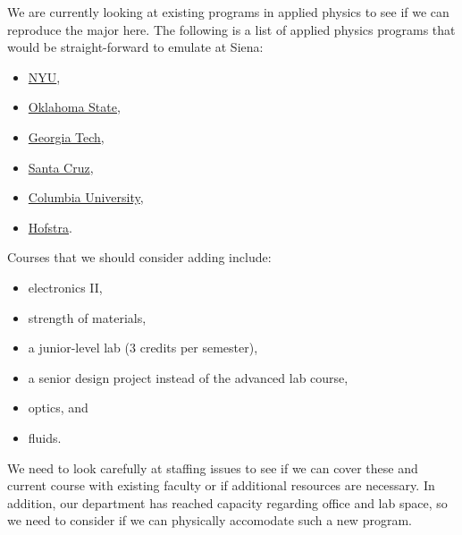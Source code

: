 \documentclass[12pt]{article}
\begin{document}
We are currently looking at existing programs in applied physics to see if we can reproduce the 
major here.  The following is a list of applied physics programs that would be straight-forward to emulate at Siena:
\vspace*{-.4cm}
\begin{itemize}
\item \href{http://engineering.nyu.edu/academics/programs/applied-physics-bs}{NYU},  
\vspace*{-.2cm}\item \href{http://physics.okstate.edu/www/degree-bs-applied.html}{Oklahoma State},  
\vspace*{-.2cm}\item \href{http://www.catalog.gatech.edu/colleges/cos/physics/ugrad/phyapp/geninfo.php}{Georgia Tech}, 
\vspace*{-.2cm}\item \href{http://undergrad.pbsci.ucsc.edu/physics/apphbs/apphbs-requirements.html}{Santa Cruz},
\vspace*{-.2cm}\item \href{http://apam.columbia.edu/applied-physics-undergraduate-program}{Columbia University},
\vspace*{-.2cm}\item \href{http://bulletin.hofstra.edu/preview\_program.php?catoid=80\&poid=10321}{Hofstra}.
\end{itemize}

Courses that we should consider adding include:  
\vspace*{-.4cm}
\begin{itemize}
\item electronics II, 
\vspace*{-.2cm}\item  strength of materials,
\vspace*{-.2cm}\item  a junior-level lab (3 credits per semester),
\vspace*{-.2cm}\item  a senior design project instead of the advanced lab course,
\vspace*{-.2cm}\item  optics, and 
\vspace*{-.2cm}\item  fluids.
\end{itemize}
We need to look carefully at staffing issues to see if we can cover these and current course with existing faculty or if additional resources are necessary.  In addition, our department has reached capacity regarding office and lab space, so we need to consider if we can physically accomodate such a new program.
\end{document}
